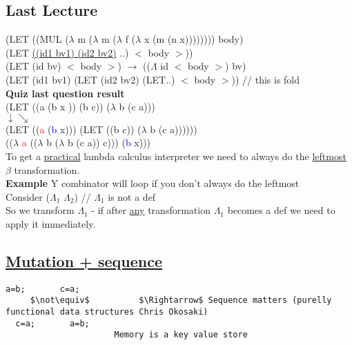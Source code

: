 \documentclass{article}
\begin{document}
\begin{flushleft}
\begin{flushleft}
\begin{flushleft}
\begin{flushleft}
\begin{flushleft}
\section*{Last Lecture}
\begin{flushleft}
\vspace*{0.3cm}
(LET ((MUL ($\lambda$ m ($\lambda$ m ($\lambda$ f ($\lambda$ x (m (n x)))))))) body)\\
\vspace*{0.2cm}
(LET \underline{((id1 bv1) (id2 bv2)} ..) $<$ body $>$))\\
\vspace*{0.2cm}
(LET (id bv) $<$ body $>$) $\rightarrow$ (($\Lambda$ id $<$ body $>$) bv)\\
\vspace*{0.2cm}
(LET (id1 bv1) (LET (id2 bv2) (LET..) $<$ body $>$)) // this is fold\\
\vspace*{0.8cm}
\pagebreak
\textbf{Quiz last question result}\\
\vspace*{0.2cm}
(LET ((a (b x )) (b c)) ($\lambda$ b (c a)))\\
\hspace*{0.5cm}$\downarrow$\hspace*{2cm}$\searrow$\\
(LET ((\textcolor{red}{a} (\textcolor{blue}{b} x))) (LET ((b c)) ($\lambda$ b (c a))))))\\
\vspace*{0.2cm}
(($\lambda$ \textcolor{red}{a} (($\lambda$ b ($\lambda$ b (c a)) c))) (\textcolor{blue}{b} x)))\\
\vspace*{1.5cm}
To get a \underline{practical} lambda calculus interpreter we need to always do the \underline{leftmost} $\beta$ transformation.\\
\bigskip
\textbf{Example} Y combinator will loop if you don't always do the leftmost\\
\vspace*{0.3cm}
Consider ($\Lambda_{1}$ $\Lambda_{2}$) // $\Lambda_{1}$ is not a def\\
\vspace*{0.3cm}
So we transform $\Lambda_{1}$ - if after \underline{any} transformation $\Lambda_{1}$ becomes a def we need to apply it immediately.
\end{flushleft}

\vspace*{1cm}
\subsection*{\underline{Mutation + sequence}}
\begin{lstlisting}[mathescape]
  a=b;       c=a;
	 $\not\equiv$          $\Rightarrow$ Sequence matters (purelly functional data structures Chris Okosaki)
  c=a;       a=b;
                      Memory is a key value store
                      

\end{lstlisting}
\end{flushleft}
\end{flushleft}
\end{flushleft}
\end{flushleft}
\end{flushleft}
\end{document}
